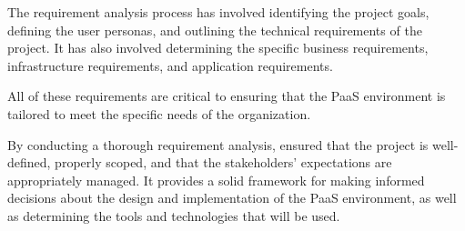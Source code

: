 The requirement analysis process has involved identifying the project goals, defining the user personas, and outlining the technical requirements of the project. It has also involved determining the specific business requirements, infrastructure requirements, and application requirements. 

All of these requirements are critical to ensuring that the PaaS environment is tailored to meet the specific needs of the organization. 

By conducting a thorough requirement analysis, ensured that the project is well-defined, properly scoped, and that the stakeholders' expectations are appropriately managed. It provides a solid framework for making informed decisions about the design and implementation of the PaaS environment, as well as determining the tools and technologies that will be used.

